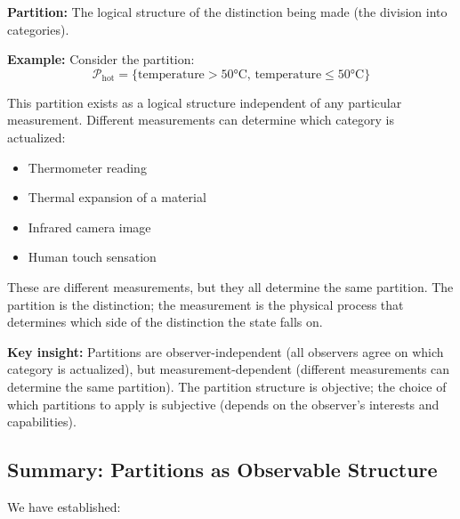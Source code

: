 \documentclass[twocolumn,10pt]{article}
\theoremstyle{definition}
\theoremstyle{remark}
\begin{document}
\vspace{0.2cm}
\noindent\textbf{Partition:} The logical structure of the distinction being made (the division into categories).

\vspace{0.2cm}
\noindent\textbf{Example:} Consider the partition:
\begin{equation}
\mathcal{P}_{\text{hot}} = \{\text{temperature} > 50°\text{C}, \, \text{temperature} \leq 50°\text{C}\}
\end{equation}

This partition exists as a logical structure independent of any particular measurement. Different measurements can determine which category is actualized:
\begin{itemize}
\item Thermometer reading
\item Thermal expansion of a material
\item Infrared camera image
\item Human touch sensation
\end{itemize}

These are different measurements, but they all determine the same partition. The partition is the distinction; the measurement is the physical process that determines which side of the distinction the state falls on.

\vspace{0.2cm}
\noindent\textbf{Key insight:} Partitions are observer-independent (all observers agree on which category is actualized), but measurement-dependent (different measurements can determine the same partition). The partition structure is objective; the choice of which partitions to apply is subjective (depends on the observer's interests and capabilities).

\subsection{Summary: Partitions as Observable Structure}

We have established:
\end{document}
